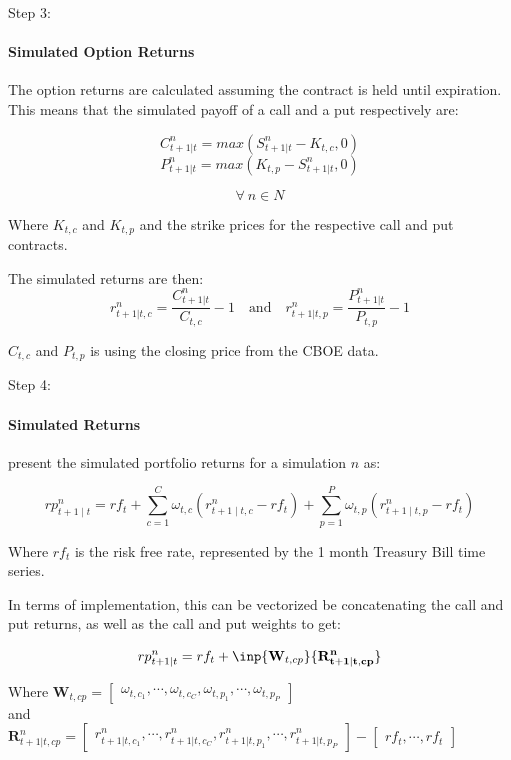 \documentclass[9pt]{beamer}
\begin{document}
\begin{frame}{Step 3: \citeauthor{faias2017optimal}}
\framesubtitle{Simulated Option Returns}
The option returns are calculated assuming the contract is held until expiration.
This means that the simulated payoff of a call and a put respectively are:

\[C_{t+1|t}^{n} = max(S_{t+1|t}^{n} - K_{t, c}, 0)\]
\[P_{t+1|t}^{n} = max(K_{t, p} - S_{t+1|t}^{n}, 0)\]

\[\forall \ n \in N\]

Where $K_{t, c}$ and $K_{t, p}$ and the strike prices for the respective call and put contracts.

The simulated returns are then:
\[r_{t+1|t, c}^{n} = \frac{C_{t+1|t}^{n}}{C_{t, c}} - 1 \quad \text{and} \quad r_{t+1|t, p}^{n} = \frac{P_{t+1|t}^{n}}{P_{t, p}} - 1\]

$C_{t, c}$ and $P_{t, p}$ is using the closing price from the CBOE data.
\end{frame}

\begin{frame}{Step 4: \citeauthor{faias2017optimal}}
\framesubtitle{Simulated Returns}
\citeauthor{faias2017optimal} present the simulated portfolio returns for a simulation $n$ as:

\[rp_{t+1 \mid t}^{n} = rf_{t}+\sum_{c = 1}^{C} \omega_{t, c}\left(r_{t + 1 \mid t, c}^{n} - rf_{t}\right)+\sum_{p = 1}^{P} \omega_{t, p}\left(r_{t + 1 \mid t, p}^{n} - rf_{t}\right)\]

Where $rf_{t}$ is the risk free rate, represented by the 1 month Treasury Bill time series.

In terms of implementation, this can be vectorized be concatenating the call and put returns, as well as the call and put weights to get:

\[rp_{t+1 \mid t}^{n} = rf_{t} + \inp{\mathbf{W}_{t, cp}}{\mathbf{R_{t+1|t, cp}^{n}}}\]

Where $\mathbf{W}_{t, cp} = \begin{bmatrix} \omega_{t, c_{1}}, \dotsb, \omega_{t, c_{C}}, \omega_{t, p_{1}}, \dotsb, \omega_{t, p_{P}} \end{bmatrix}$ \\
and \\
$\mathbf{R}_{t+1|t, cp}^{n} = \begin{bmatrix} r_{t + 1|t, c_{1}}^{n}, \dotsb, r_{t + 1|t, c_{C}}^{n}, r_{t + 1|t, p_{1}}^{n}, \dotsb, r_{t + 1|t, p_{P}}^{n} \end{bmatrix} - \begin{bmatrix} rf_{t}, \dotsb, rf_{t} \end{bmatrix}$
\end{frame}
\end{document}
